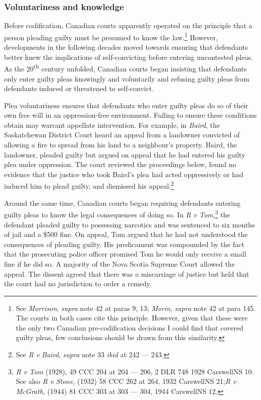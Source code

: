 \subsubsection{Voluntariness and knowledge}

Before codification, Canadian courts apparently operated on the principle that a person pleading guilty must be presumed to know the law.\footnote{See \textit{Morrison}, \textit{supra} note 42 at paras 9, 13; \textit{Morin}, \textit{supra} note 42 at para 145. The courts in both cases cite this principle. However, given that these were the only two Canadian pre-codification decisions I could find that covered guilty pleas, few conclusions should be drawn from this similarity.} However, developments in the following decades moved towards ensuring that defendants better knew the implications of self-convicting before entering uncontested pleas. As the 20\textsuperscript{th} century unfolded, Canadian courts began insisting that defendants only enter guilty pleas knowingly and voluntarily and refusing guilty pleas from defendants induced or threatened to self-convict.

Plea voluntariness ensures that defendants who enter guilty pleas do so of their own free will in an oppression-free environment. Failing to ensure these conditions obtain may warrant appellate intervention. For example, in \textit{Baird}, the Saskatchewan District Court heard an appeal from a landowner convicted of allowing a fire to spread from his land to a neighbour's property. Baird, the landowner, pleaded guilty but argued on appeal that he had entered his guilty plea under oppression. The court reviewed the proceedings below, found no evidence that the justice who took Baird's plea had acted oppressively or had induced him to plead guilty, and dismissed his appeal.\footnote{See \textit{R v Baird}, \textit{supra} note 33 \textit{ibid} at 242 — 243.}

Around the same time, Canadian courts began requiring defendants entering guilty pleas to know the legal consequences of doing so. In \textit{R v Tom},\footnote{\textit{R v Tom} (1928), 49 CCC 204 at 204 — 206, 2 DLR 748 1928 CarswellNS 10. See also \textit{R v Stone}, (1932) 58 CCC 262 at 264, 1932 CarswellNS 21;\textit{R v McGrath}, (1944) 81 CCC 303 at 303 — 304, 1944 CarswellNS 12.} the defendant pleaded guilty to possessing narcotics and was sentenced to six months of jail and a \$500 fine. On appeal, Tom argued that he had not understood the consequences of pleading guilty. His predicament was compounded by the fact that the prosecuting police officer promised Tom he would only receive a small fine if he did so. A majority of the Nova Scotia Supreme Court allowed the appeal. The dissent agreed that there was a miscarriage of justice but held that the court had no jurisdiction to order a remedy. 

